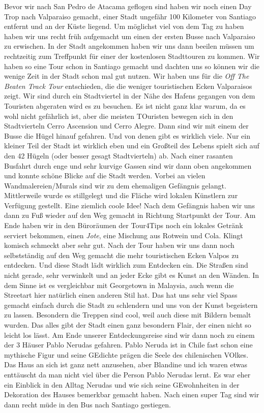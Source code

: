 \documentclass[11pt]{book}
\begin{document}
Bevor wir nach San Pedro de Atacama geflogen sind haben wir noch einen Day Trop nach Valparaiso gemacht, einer Stadt ungefähr 100 Kilometer von
Santiago entfernt und an der Küste liegend. Um möglichst viel von dem Tag zu haben haben wir uns recht früh aufgemacht um einen der ersten Busse 
nach Valparaiso zu erwischen. In der Stadt angekommen haben wir uns dann beeilen müssen um rechtzeitig zum Treffpunkt für einer der kostenlosen 
Stadttouren zu kommen. Wir haben so eine Tour schon in Santiago gemacht und dachten uns so können wir die wenige Zeit in der Stadt schon mal gut 
nutzen. Wir haben uns für die \emph{Off The Beaten Track Tour} entschieden, die die weniger touristischen Ecken Valparaisos zeigt. Wir sind durch 
ein Stadtviertel in der Nähe des Hafens gegangen von dem Touristen abgeraten wird es zu besuchen. Es ist nicht ganz klar warum, da es wohl nicht 
gefährlich ist, aber die meisten TOuristen bewegen sich in den Stadtvierteln Cerro Ascension und Cerro Alegre. Dann sind wir mit einem der Busse 
die Hügel hinauf gefahren. Und von denen gibt es wirklich viele. Nur ein kleiner Teil der Stadt ist wirklich eben und ein Großteil des Lebens spielt 
sich auf den 42 Hügeln (oder besser gesagt Stadtvierteln) ab. Nach einer rasanten Busfahrt durch enge und sehr kurvige Gassen sind wir dann oben angekommen 
und konnte schöne Blicke auf die Stadt werden. Vorbei an vielen Wandmalereien/Murals sind wir zu dem ehemaligen Gefängnis gelangt. Mittlerweile wurde 
es stillgelegt und die Fläche wird lokalen Künstlern zur Verfügung gestellt. Eine ziemlich coole Idee! Nach dem Gefängnis haben wir uns dann zu Fuß wieder 
auf den Weg gemacht in Richtung Startpunkt der Tour. Am Ende haben wir in den Büroräumen der Tour4Tips noch ein lokales Getränk serviert bekommen, 
einen \emph{Jote}, eine Mischung aus Rotwein und Cola. Klingt komisch schmeckt aber sehr gut. 
Nach der Tour haben wir uns dann noch selbstständig auf den Weg gemacht die mehr touristischen Ecken Valpos zu entdecken. Und diese Stadt lädt wirklich 
zum Entdecken ein. Die Straßen sind nicht gerade, sehr verwinkelt und an jeder Ecke gibt es Kunst an den Wänden. In dem Sinne ist es vergleichbar mit 
Georgetown in Malaysia, auch wenn die Streetart hier natürlich einen anderen Stil hat. Das hat uns sehr viel Spass gemacht einfach durch die Stadt 
zu schlendern und uns von der Kunst begeistern zu lassen. Besondern die Treppen sind cool, weil auch diese mit Bildern bemalt wurden. Das alles gibt 
der Stadt einen ganz besondern Flair, der einen nicht so leicht los lässt. Am Ende unserer Entdeckungsreise sind wir dann noch zu einem der 3 Häuser 
Pablo Nerudas gefahren. Pablo Neruda ist in Chile fast schon eine mythische Figur und seine GEdichte prägen die Seele des chilenischen VOlkes. Das 
Haus an sich ist ganz nett anzusehen, aber Blandine und ich waren etwas enttäuscht da man nicht viel über die Person Pablo Nerudas lernt. Es war eher 
ein Einblick in den Alltag Nerudas und wie sich seine GEwohnheiten in der Dekoration des Hauses bemerkbar gemacht haben. 
Nach einen super Tag sind wir dann recht müde in den Bus nach Santiago gestiegen.
\end{document}
